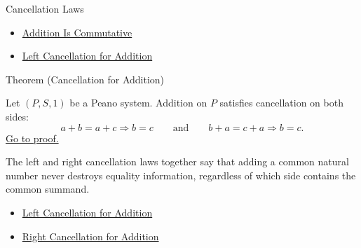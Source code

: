 \begin{topicbox}{Cancellation Laws}
\begin{dependencies}
\begin{itemize}
  \item \hyperref[thm:addition-commutative]{Addition Is Commutative}
  \item \hyperref[thm:addition-left-cancellation]{Left Cancellation for Addition}
\end{itemize}
\end{dependencies}

\begin{theorembox}{Theorem (Cancellation for Addition)}
\begin{theorem}
\label{thm:addition-cancellation}
Let $(P,S,1)$ be a Peano system. Addition on $P$ satisfies cancellation on
both sides:
\[
a+b=a+c\Longrightarrow b=c
\qquad\text{and}\qquad
b+a=c+a\Longrightarrow b=c.
\]
\hyperref[prf:addition-cancellation]{Go to proof.}
\end{theorem}
\end{theorembox}

\begin{remark*}[Interpretation]
The left and right cancellation laws together say that adding a common natural
number never destroys equality information, regardless of which side contains
the common summand.
\end{remark*}

\begin{dependencies}
\begin{itemize}
  \item \hyperref[thm:addition-left-cancellation]{Left Cancellation for Addition}
  \item \hyperref[thm:addition-right-cancellation]{Right Cancellation for Addition}
\end{itemize}
\end{dependencies}
\end{topicbox}

